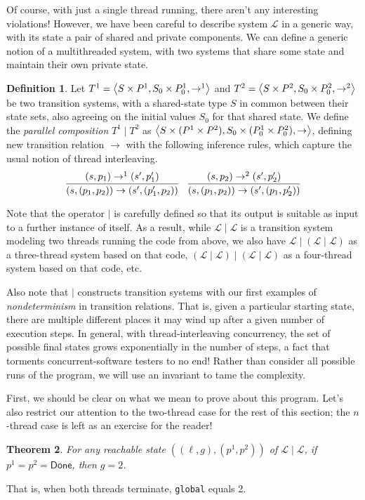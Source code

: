 \documentclass{amsbook}
\newtheorem{theorem}{Theorem}[chapter]
\theoremstyle{definition}
\newtheorem{definition}[theorem]{Definition}
\theoremstyle{remark}
\numberwithin{section}{chapter}
\numberwithin{equation}{chapter}
\begin{document}
Of course, with just a single thread running, there aren't any interesting violations!
However, we have been careful to describe system $\mathcal L$ in a generic way, with its state a pair of shared and private components.
We can define a generic notion of a multithreaded system, with two systems that share some state and maintain their own private state.

\encoding
\begin{definition}
  Let $T^1 = {\left \langle S \times P^1, S_0 \times P^1_0, \to^1 \right \rangle}$ and $T^2 = {\left \langle S \times P^2, S_0 \times P^2_0, \to^2 \right \rangle}$ be two transition systems, with a shared-state type $S$ in common between their state sets, also agreeing on the initial values $S_0$ for that shared state.  We define the \emph{parallel composition} $T^1 \mid T^2$ as ${\left \langle S \times (P^1 \times P^2), S_0 \times (P^1_0 \times P^2_0), \to \right \rangle}$, defining new transition relation $\to$ with the following inference rules, which capture the usual notion of thread interleaving.
  $$\infer{(s, (p_1, p_2)) \to (s', (p'_1, p_2))}{
    (s, p_1) \to^1 (s', p'_1)
  }
  \quad \infer{(s, (p_1, p_2)) \to (s', (p_1, p'_2))}{
    (s, p_2) \to^2 (s', p'_2)
  }$$
\end{definition}

Note that the operator $\mid$ is carefully defined so that its output is suitable as input to a further instance of itself.
As a result, while $\mathcal L \mid \mathcal L$ is a transition system modeling two threads running the code from above, we also have $\mathcal L \mid (\mathcal L \mid \mathcal L)$ as a three-thread system based on that code, $(\mathcal L \mid \mathcal L) \mid (\mathcal L \mid \mathcal L)$ as a four-thread system based on that code, etc.

Also note that $\mid$ constructs transition systems with our first examples of \emph{nondeterminism} in transition relations.
That is, given a particular starting state, there are multiple different places it may wind up after a given number of execution steps.
In general, with thread-interleaving concurrency, the set of possible final states grows exponentially in the number of steps, a fact that torments concurrent-software testers to no end!
Rather than consider all possible runs of the program, we will use an invariant to tame the complexity.

First, we should be clear on what we mean to prove about this program.
Let's also restrict our attention to the two-thread case for the rest of this section; the $n$-thread case is left as an exercise for the reader!
\begin{theorem}
  For any reachable state $((\ell, g), (p^1, p^2))$ of $\mathcal L \mid \mathcal L$, if $p^1 = p^2 = \mathsf{Done}$, then $g = 2$.
\end{theorem}
That is, when both threads terminate, \texttt{global} equals 2.
\end{document}
